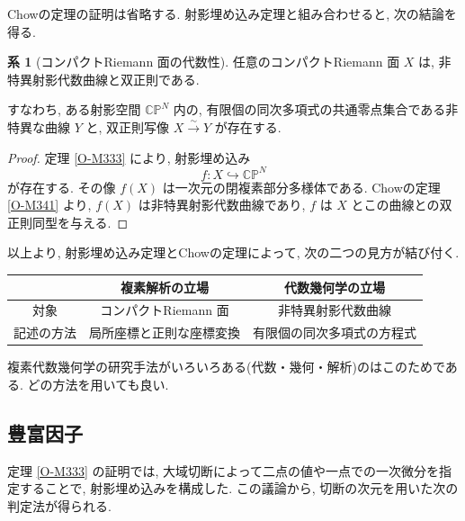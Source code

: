 \documentclass[dvipdfmx,a4paper,11pt]{article} %
\newcommand{\C}{\mathbb{C}}
\theoremstyle{definition}
\numberwithin{equation}{section}
\newtheorem{cor}[thm]{系}
\begin{document}
Chowの定理の証明は省略する.
射影埋め込み定理と組み合わせると, 次の結論を得る.

\begin{cor}[コンパクトRiemann 面の代数性]\label{O-M342}
任意のコンパクトRiemann 面 $X$ は, 
非特異射影代数曲線と双正則である.

すなわち, ある射影空間 $\C\mathbb P^N$ 内の, 
有限個の同次多項式の共通零点集合である非特異な曲線 $Y$ と, 
双正則写像
\(
X\xrightarrow{\sim}Y
\)
が存在する.
\end{cor}

\begin{proof}
定理 \ref{O-M333} により, 射影埋め込み
\[
f:X\hookrightarrow\C\mathbb P^N
\]
が存在する.
その像 $f(X)$ は一次元の閉複素部分多様体である.
Chowの定理 \ref{O-M341} より, 
$f(X)$ は非特異射影代数曲線であり, 
$f$ は $X$ とこの曲線との双正則同型を与える.
\end{proof}

以上より, 射影埋め込み定理とChowの定理によって, 
次の二つの見方が結び付く.

\begin{center}
\renewcommand{\arraystretch}{1.4}
\begin{tabular}{c|c|c}
 & 複素解析の立場 & 代数幾何学の立場 \\ \hline
対象
& コンパクトRiemann 面
& 非特異射影代数曲線 \\
記述の方法
& 局所座標と正則な座標変換
& 有限個の同次多項式の方程式
\end{tabular}
\end{center}

複素代数幾何学の研究手法がいろいろある(代数・幾何・解析)のはこのためである. 
どの方法を用いても良い. 

\subsection{豊富因子}
定理 \ref{O-M333} の証明では, 
大域切断によって二点の値や一点での一次微分を指定することで, 
射影埋め込みを構成した.
この議論から, 切断の次元を用いた次の判定法が得られる.
\end{document}
